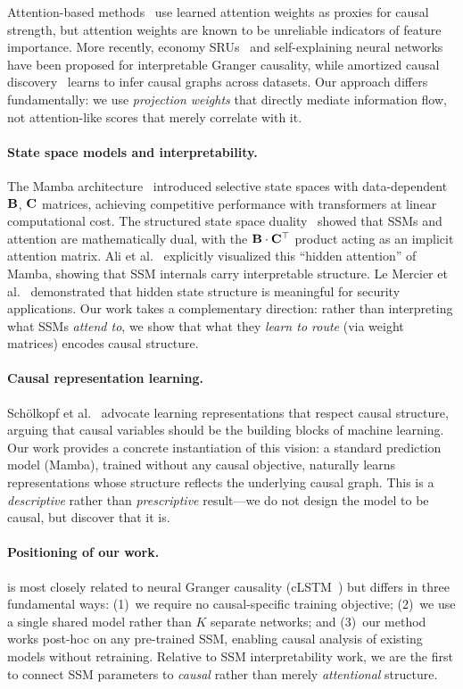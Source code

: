 Attention-based methods~\citep{nauta2019causal} use learned attention
weights as proxies for causal strength, but attention weights are known
to be unreliable indicators of feature importance. More recently,
economy SRUs~\citep{khanna2019economy} and self-explaining neural
networks~\citep{marcinkevics2021interpretable} have been proposed for
interpretable Granger causality, while amortized causal
discovery~\citep{lowe2022amortized} learns to infer causal graphs
across datasets. Our approach differs fundamentally: we use
\emph{projection weights} that directly mediate information flow, not
attention-like scores that merely correlate with it.

\paragraph{State space models and interpretability.}
The Mamba architecture~\citep{gu2023mamba} introduced selective state
spaces with data-dependent $\mathbf{B}$, $\mathbf{C}$ matrices, achieving competitive
performance with transformers at linear computational cost. The structured
state space duality~\citep{dao2024transformers} showed that SSMs and
attention are mathematically dual, with the $\mathbf{B} \cdot \mathbf{C}^\top$ product
acting as an implicit attention matrix. Ali et al.~\citep{ali2024hidden}
explicitly visualized this ``hidden attention'' of Mamba, showing that
SSM internals carry interpretable structure. Le Mercier et
al.~\citep{lemercier2026hispa} demonstrated that hidden state structure
is meaningful for security applications. Our work takes a complementary
direction: rather than interpreting what SSMs \emph{attend to}, we show
that what they \emph{learn to route} (via weight matrices) encodes causal
structure.

\paragraph{Causal representation learning.}
Sch\"olkopf et al.~\citep{scholkopf2021toward} advocate learning
representations that respect causal structure, arguing that causal
variables should be the building blocks of machine learning. Our work
provides a concrete instantiation of this vision: a standard prediction
model (Mamba), trained without any causal objective, naturally learns
representations whose structure reflects the underlying causal graph.
This is a \emph{descriptive} rather than \emph{prescriptive} result---we
do not design the model to be causal, but discover that it is.

\paragraph{Positioning of our work.}
\methodname{} is most closely related to neural Granger causality
(cLSTM~\citep{tank2021neural}) but differs in three fundamental ways:
(1)~we require no causal-specific training objective;
(2)~we use a single shared model rather than $K$ separate networks; and
(3)~our method works post-hoc on any pre-trained SSM, enabling causal
analysis of existing models without retraining. Relative to SSM
interpretability work, we are the first to connect SSM parameters to
\emph{causal} rather than merely \emph{attentional} structure.
